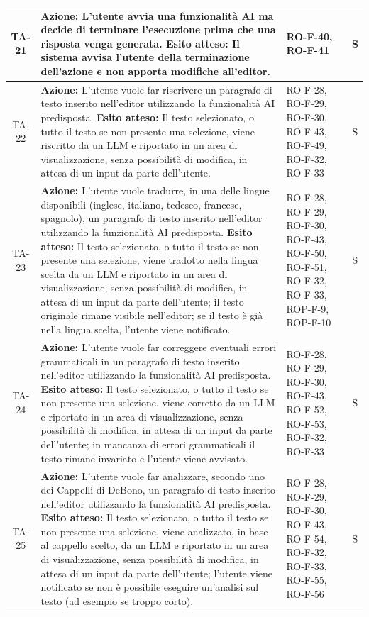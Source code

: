\documentclass[11pt,a4paper]{article}
\begin{document}
\begin{longtable}{|c|p{9cm}|p{3cm}|c|}
\hline
TA-21 & \textbf{Azione:} L'utente avvia una funzionalità AI ma decide di terminare l'esecuzione prima che una risposta venga generata. \newline \textbf{Esito atteso:} Il sistema avvisa l'utente della terminazione dell'azione e non apporta modifiche all'editor. & RO-F-40, RO-F-41 & S \\
\hline
TA-22 & \textbf{Azione:} L'utente vuole far riscrivere un paragrafo di testo inserito nell'editor utilizzando la funzionalità AI predisposta. \newline \textbf{Esito atteso:} Il testo selezionato, o tutto il testo se non presente una selezione, viene riscritto da un LLM e riportato in un area di visualizzazione, senza possibilità di modifica, in attesa di un input da parte dell'utente. & RO-F-28, RO-F-29, RO-F-30, RO-F-43, RO-F-49, RO-F-32, RO-F-33  & S \\
\hline
TA-23 & \textbf{Azione:} L'utente vuole tradurre, in una delle lingue disponibili (inglese, italiano, tedesco, francese, spagnolo), un paragrafo di testo inserito nell'editor utilizzando la funzionalità AI predisposta. \newline \textbf{Esito atteso:} Il testo selezionato, o tutto il testo se non presente una selezione, viene tradotto nella lingua scelta da un LLM e riportato in un area di visualizzazione, senza possibilità di modifica, in attesa di un input da parte dell'utente; il testo originale rimane visibile nell'editor; se il testo è già nella lingua scelta, l'utente viene notificato. & RO-F-28, RO-F-29, RO-F-30, RO-F-43, RO-F-50, RO-F-51, RO-F-32, RO-F-33, ROP-F-9, ROP-F-10  & S \\
\hline
TA-24 & \textbf{Azione:} L'utente vuole far correggere eventuali errori grammaticali in un paragrafo di testo inserito nell'editor utilizzando la funzionalità AI predisposta. \newline \textbf{Esito atteso:} Il testo selezionato, o tutto il testo se non presente una selezione, viene corretto da un LLM e riportato in un area di visualizzazione, senza possibilità di modifica, in attesa di un input da parte dell'utente; in mancanza di errori grammaticali il testo rimane invariato e l'utente viene avvisato. & RO-F-28, RO-F-29, RO-F-30, RO-F-43, RO-F-52, RO-F-53, RO-F-32, RO-F-33  & S \\
\hline
TA-25 & \textbf{Azione:} L'utente vuole far analizzare, secondo uno dei Cappelli di DeBono, un paragrafo di testo inserito nell'editor utilizzando la funzionalità AI predisposta. \newline \textbf{Esito atteso:} Il testo selezionato, o tutto il testo se non presente una selezione, viene analizzato, in base al cappello scelto, da un LLM e riportato in un area di visualizzazione, senza possibilità di modifica, in attesa di un input da parte dell'utente; l'utente viene notificato se non è possibile eseguire un'analisi sul testo (ad esempio se troppo corto). & RO-F-28, RO-F-29, RO-F-30, RO-F-43, RO-F-54, RO-F-32, RO-F-33, RO-F-55, RO-F-56  & S \\

\end{longtable}
\end{document}
